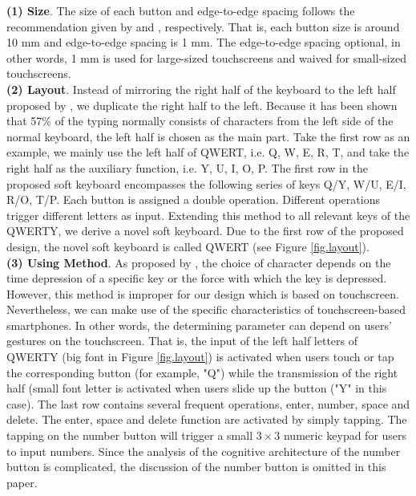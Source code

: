 \documentclass{singlecol-new}
\theoremstyle{TH}{
\newtheorem{lemma}{Lemma}
\newtheorem{theorem}[lemma]{Theorem}
\newtheorem{corrolary}[lemma]{Corrolary}
\newtheorem{conjecture}[lemma]{Conjecture}
\newtheorem{proposition}[lemma]{Proposition}
\newtheorem{claim}[lemma]{Claim}
\newtheorem{stheorem}[lemma]{Wrong Theorem}
\newtheorem{algorithm}{Algorithm}
}
\theoremstyle{THrm}{
\newtheorem{definition}{Definition}[section]
\newtheorem{question}{Question}[section]
\newtheorem{remark}{Remark}
\newtheorem{scheme}{Scheme}
}
\theoremstyle{THhit}{
\newtheorem{case}{Case}[section]
}
\begin{document}
\textbf{(1)	Size}.
The size of each button and edge-to-edge spacing follows the recommendation given by \citet{park2010touch} and \citet{colle2004standing}, respectively. That is, each button size is around 10 mm and edge-to-edge spacing is 1 mm. The edge-to-edge spacing optional, in other words, 1 mm is used for large-sized touchscreens and waived for small-sized touchscreens. \\

\textbf{(2)	Layout}.
Instead of mirroring the right half of the keyboard to the left half proposed by \citet{matias1994half}, we duplicate the right half to the left. Because it has been shown that 57\% of the typing normally consists of characters from the left side of the normal keyboard, the left half is chosen as the main part. Take the first row as an example, we mainly use the left half of QWERT, i.e. Q, W, E, R, T, and take the right half as the auxiliary function, i.e. Y, U, I, O, P. The first row in the proposed soft keyboard encompasses the following series of keys Q/Y, W/U, E/I, R/O, T/P. Each button is assigned a double operation. Different operations trigger different letters as input. Extending this method to all relevant keys of the QWERTY, we derive a novel soft keyboard. Due to the first row of the proposed design, the novel soft keyboard is called QWERT (see Figure \ref{fig.layout}). \\

\textbf{(3)	Using Method}.
As proposed by \citet{matias1994half}, the choice of character depends on the time depression of a specific key or the force with which the key is depressed. However, this method is improper for our design which is based on touchscreen. Nevertheless, we can make use of the specific characteristics of touchscreen-based smartphones. In other words, the determining parameter can depend on users' gestures on the touchscreen. That is, the input of the left half letters of QWERTY (big font in Figure \ref{fig.layout}) is activated when users touch or tap the corresponding button (for example, "Q") while the transmission of the right half (small font letter is activated when users slide up the button ("Y" in this case). The last row contains several frequent operations, enter, number, space and delete. The enter, space and delete function are activated by simply tapping. The tapping on the number button will trigger a small $3\times3$ numeric keypad for users to input numbers. Since the analysis of the cognitive architecture of the number button is complicated, the discussion of the number button is omitted in this paper. \\
\end{document}
